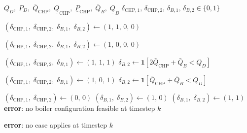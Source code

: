 \begin{algorithm}
\caption{CHP-on unit-commitment heuristic (evaluated per timestep $k$)}
\label{alg:chp-on}
\begin{algorithmic}[1]
\Require $Q_D,\; P_D,\;
         \bar{Q}_\mathrm{CHP},\; \underline{Q}_\mathrm{CHP},\;
         \underline{P}_\mathrm{CHP},\;
         \bar{Q}_B,\; \underline{Q}_B$
\Ensure $\delta_{\mathrm{CHP},1},\,\delta_{\mathrm{CHP},2},\,
         \delta_{B,1},\,\delta_{B,2} \in \{0,1\}$

    \State $(\delta_{\mathrm{CHP},1},\;\delta_{\mathrm{CHP},2},\;
            \delta_{B,1},\;\delta_{B,2}) \gets (1,\,1,\,0,\,0)$

    \State $(\delta_{\mathrm{CHP},1},\;\delta_{\mathrm{CHP},2},\;
            \delta_{B,1},\;\delta_{B,2}) \gets (1,\,0,\,0,\,0)$

    \State $(\delta_{\mathrm{CHP},1},\;\delta_{\mathrm{CHP},2},\;
            \delta_{B,1}) \gets (1,\,1,\,1)$
    \State $\delta_{B,2} \gets
            \mathbf{1}\!\left[2\bar{Q}_\mathrm{CHP} + \bar{Q}_B < Q_D\right]$

    \State $(\delta_{\mathrm{CHP},1},\;\delta_{\mathrm{CHP},2},\;
            \delta_{B,1}) \gets (1,\,0,\,1)$
    \State $\delta_{B,2} \gets
            \mathbf{1}\!\left[\bar{Q}_\mathrm{CHP} + \bar{Q}_B < Q_D\right]$

    \State $(\delta_{\mathrm{CHP},1},\;\delta_{\mathrm{CHP},2}) \gets (0,\,0)$
        \State $(\delta_{B,1},\;\delta_{B,2}) \gets (1,\,0)$
        \State $(\delta_{B,1},\;\delta_{B,2}) \gets (1,\,1)$
    \Else
        \State \textbf{error}: no boiler configuration feasible at timestep $k$
    \EndIf

\Else
    \State \textbf{error}: no case applies at timestep $k$
\EndIf
\end{algorithmic}
\end{algorithm}


